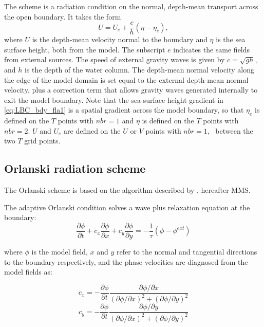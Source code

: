 \documentclass[../main/NEMO_manual]{subfiles}
\begin{document}
The \citet{flather_JPO94} scheme is a radiation condition on the normal,
depth-mean transport across the open boundary.
It takes the form
\begin{equation}
  \label{eq:LBC_bdy_fla1}
  U = U_{e} + \frac{c}{h}\left(\eta - \eta_{e}\right),
\end{equation}
where $U$ is the depth-mean velocity normal to the boundary and $\eta$ is the sea surface height,
both from the model.
The subscript $e$ indicates the same fields from external sources.
The speed of external gravity waves is given by $c = \sqrt{gh}$, and $h$ is the depth of the water column.
The depth-mean normal velocity along the edge of the model domain is set equal to
the external depth-mean normal velocity,
plus a correction term that allows gravity waves generated internally to exit the model boundary.
Note that the sea-surface height gradient in \autoref{eq:LBC_bdy_fla1} is a spatial gradient across the model boundary,
so that $\eta_{e}$ is defined on the $T$ points with $nbr=1$ and $\eta$ is defined on the $T$ points with $nbr=2$.
$U$ and $U_{e}$ are defined on the $U$ or $V$ points with $nbr=1$, \ie\ between the two $T$ grid points.

\subsection{Orlanski radiation scheme}
\label{subsec:LBC_bdy_orlanski_scheme}

The Orlanski scheme is based on the algorithm described by \citep{marchesiello.mcwilliams.ea_OM01}, hereafter MMS.

The adaptive Orlanski condition solves a wave plus relaxation equation at the boundary:
\begin{equation}
  \label{eq:LBC_wave_continuous}
  \frac{\partial\phi}{\partial t} + c_x \frac{\partial\phi}{\partial x} + c_y \frac{\partial\phi}{\partial y} =
  -\frac{1}{\tau}(\phi - \phi^{ext})
\end{equation}

where $\phi$ is the model field, $x$ and $y$ refer to the normal and tangential directions to the boundary respectively, and the phase
velocities are diagnosed from the model fields as:

\begin{equation}
  \label{eq:LBC_cx}
  c_x = -\frac{\partial\phi}{\partial t}\frac{\partial\phi / \partial x}{(\partial\phi /\partial x)^2 + (\partial\phi /\partial y)^2}
\end{equation}
\begin{equation}
  \label{eq:LBC_cy}
  c_y = -\frac{\partial\phi}{\partial t}\frac{\partial\phi / \partial y}{(\partial\phi /\partial x)^2 + (\partial\phi /\partial y)^2}
\end{equation}
\end{document}
